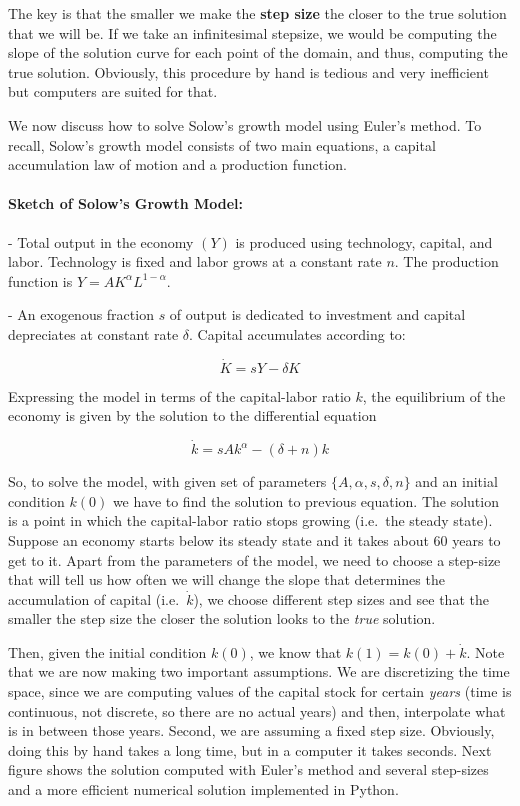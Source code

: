 \documentclass[a4paper,11pt]{article}
\theoremstyle{definition}
\theoremstyle{plain}
\begin{document}
The key is that the smaller we make the \textbf{step size} the closer to the true solution that we will be. If we take an infinitesimal stepsize, we would be computing the slope of the solution curve for each point of the domain, and thus, computing the true solution. Obviously, this procedure by hand is tedious and very inefficient but computers are
suited for that.

We now discuss how to solve Solow's growth model using Euler's method. To recall, Solow's growth model consists of two main equations, a capital accumulation law of motion and a production function.

\paragraph{Sketch of Solow's Growth Model:} 

- Total output in the economy \((Y)\) is produced using technology, capital, and labor. Technology is
fixed and labor grows at a constant rate \(n\). The production function is \(Y = AK^{\alpha}L^{1-\alpha}\). 

- An exogenous fraction \(s\) of output is dedicated to investment and capital depreciates at constant
rate \(\delta\). Capital accumulates according to: 

\[
\dot{K} = sY - \delta K
\]

Expressing the model in terms of the capital-labor ratio \(k\), the equilibrium of the economy is given by the solution to the differential equation

\[
\dot{k} = sAk^{\alpha} - (\delta + n)k
\]

So, to solve the model, with given set of parameters \(\{A,\alpha,s,\delta,n\}\) and an initial condition \(k(0)\) we have to find the solution to previous equation. The solution is a point in which the capital-labor ratio stops growing (i.e.~the steady state). Suppose an economy starts below its steady state and it takes about 60 years to get to it. Apart from the parameters of the model, we need to choose a step-size that will tell us how often we will change the slope that determines the accumulation of capital (i.e.~\(\dot{k}\)), we choose different step sizes and see that the smaller the step size the closer the solution looks to the \emph{true} solution.

Then, given the initial condition \(k(0)\), we know that \(k(1) = k(0) + \dot{k}\). Note that we are now making two important assumptions. We are discretizing the time space, since we are computing values of the capital stock for certain \emph{years} (time is continuous, not discrete, so there are no actual years) and then, interpolate what is in between those years. Second, we are assuming a fixed step size. Obviously, doing this by hand takes a long time, but in
a computer it takes seconds. Next figure shows the solution computed with Euler's method and several step-sizes and a more efficient numerical solution implemented in Python.
\end{document}

